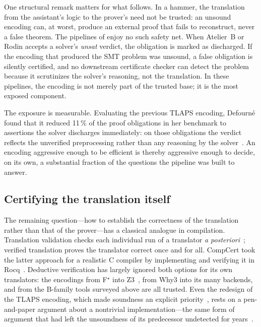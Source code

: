 One structural remark matters for what follows.
In a hammer, the translation from the assistant's logic to the prover's need not
be trusted: an unsound encoding can, at worst, produce an external proof that
fails to reconstruct, never a false theorem. The pipelines of
 enjoy no such safety net. When Atelier~B or Rodin
accepts a solver's \emph{unsat} verdict, the obligation is marked as discharged.
If the encoding that produced the SMT problem was unsound, a false obligation
is silently certified, and no downstream certificate checker can detect the
problem because it scrutinizes the solver's reasoning, not the translation. In
these pipelines, the encoding is not merely part of the trusted base; it is the
most exposed component.

The exposure is measurable. Evaluating the previous TLAPS encoding, Defourn\'e
found that it reduced 11\,\% of the proof obligations in her benchmark to
assertions the solver discharges immediately: on those obligations the verdict
reflects the unverified preprocessing rather than any reasoning by the
solver~\cite{defourne2025encoding}. An encoding aggressive enough to be
efficient is thereby aggressive enough to decide, on its own, a substantial
fraction of the questions the pipeline was built to answer.

\subsection{Certifying the translation itself}
\label{subsec:rw-certified-translation}

The remaining question---how to establish the correctness of the translation
rather than that of the prover---has a classical analogue in compilation.
Translation validation checks each individual run of a translator \emph{a
posteriori}~\cite{pnueli1998translation}; verified translation proves the
translator correct once and for all. CompCert took the latter approach for a
realistic C compiler by implementing and verifying it in
Rocq~\cite{leroy2009compcert}. Deductive verification has largely ignored both
options for its own translators: the encodings from F\(^\star\) into
Z3~\cite{fstar}, from Why3 into its many backends, and from the B-family tools
surveyed above are all trusted. Even the redesign of the TLAPS encoding, which
made soundness an explicit priority~\cite{defourne2023encoding}, rests on a
pen-and-paper argument about a nontrivial implementation---the same form of
argument that had left the unsoundness of its predecessor undetected for
years~\cite{defourne2025encoding}.

